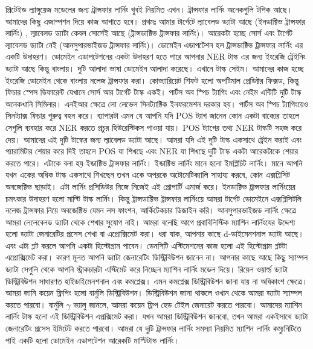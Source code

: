 \documentclass{article}[book]
\begin{document}
প্রিটেইন্ড ল্যাঙ্গুয়েজ মডেলের জন্য ট্রান্সফার লার্নিং খুবই নিয়মিত এখন। ট্রান্সফার লার্নিং অনেকগুলি টপিক আছে। আমাদের কিছু এজাম্পশন দিয়ে কাজ আগাতে হবে। প্রথমঃ আমার টার্গেটে ল্যাবেলড ড্যাটা আছে (ইনডাক্টিভ ট্রান্সফার লার্নিং) , ল্যাবেলড ড্যাটা কেবল সোর্সেই আছে (ট্রান্সডাক্টিভ ট্রান্সফার লার্নিং)। আরেকটা হচ্ছে সোর্স এবং টার্গেট ল্যাবেলড ড্যাটা নেই (আনসুপারভাইজড ট্রান্সফার লার্নিং)। ডোমেইন এডাপটেশন হল ট্রান্সডাক্টিভ ট্রান্সফার লার্নিং এর একটি উদাহরণ। ডোমেইন এডাপটেশনের একটা উদাহরণ হতে পারে আপনার NER টাস্ক এর জন্য ইংরেজি ট্রেইনিং ড্যাটা আছে কিন্তু বাংলায়। দুটি আলাদা ভাষা ডোমেইন আলাদা করেছে। এখানে টাস্ক সেইম। আমাদের কাজ হচ্ছে ইংরেজি ডোমেইন থেকে বাংলায় নলেজ ট্রান্সফার করা।  কোভ্যারিয়েট শিফট হলো অপটিমাল প্রেডিক্টর ফিক্সড, কিন্তু ফিচার স্পেস ডিফারেন্ট যেখানে সোর্স আর টার্গেট টাস্ক একই। পার্টস অব স্পিচ ট্যাগিং এবং নেইম এন্টিটি দুটি টাস্ক অনেকখানি সিমিলার। এনইআর ক্ষেত্রে লো লেভেল সিনট্যাক্টিক ইনফরমেশন দরকার হয়। পার্টস অব স্পিচ ট্যাগিংয়েও সিনট্যাক্স ফিচার গুরুত্ব বহন করে। ব্যাপারটা এমন যে আপনি যদি POS ট্যাগ জানেন কোন একটা বাক্যের তাহলে সেগুলি ব্যবহার করে NER করতে প্রচুর হিউরেস্টিকস পাওয়া যায়। POS ট্যাগের তথ্য NER টাস্কটি সহজ করে দেয়। আমাদের এই দুটি টাস্কের জন্য ল্যাবেলড ড্যাটা আছে। আমরা যদি এই দুটি টাস্ক একসাথে ট্রেইন করাই এবং প্যারামিটার শেয়ার করে দিই তাহলে POS যা শিখছে এবং NER যা শিখছে দুটি টাস্ক একটা আরেকটাকে শেয়ার করতে পারে। এটাকে বলা হয় ইন্ডাক্টিভ ট্রান্সফার লার্নিং। ইন্ডাক্টিভ লার্নিং মানে হলো ইমপ্লিচিট লার্নিং। মানে আপনি যখন একের অধিক টাস্ক একসাথে শিখছেন  তখন একে অপরকে অটোমেটিক্যালি সাহায্য করবে, কোন এক্সপ্লিসিট অবজেক্টিভ ছাড়াই। এটা লার্নিং প্রসিডিউর নিজে নিজেই এই প্রোপার্টি এমার্জ করে। ইনডাক্টিভ ট্রান্সফার লার্নিংয়ের চমৎকার উদাহরণ হলো মাল্টি টাস্ক লার্নিং। কিন্তু ট্রান্সডাক্টিভ ট্রান্সফার লার্নিংয়ে  আমরা টার্গেট ডোমেইনে এক্সপ্লিসিটলি নলেজ ট্রান্সফার নিয়ে অবজেক্টিভ যেমন লস ফাংশন, আর্কিটেকচার ডিজাইন করি। আনসুপারভাইজড লার্নিং ক্ষেত্রে আমরা লেলেবেলড ড্যাটা থেকে শেখার সুযোগ নাই। আমরা বলেছি আগে প্রবাবিলিস্টিক ম্যাশিন লার্নিংযের উদ্দেশ্য হলো ড্যাটা জেনারেটির প্রসেস শেখা বা এপ্রোক্সিমেট করা। ধরা যাক, আপনার কাছে d-ডাইমেনশনাল ড্যাটা আছে। এবং এটা  প্লট করলে আপনি একটা হিস্টোগ্রাম পাবেন। ডেনসিটি এস্টিমেশনের কাজ হলো এই হিস্টোগ্রাম প্লটটা এপ্রোক্সিমেট করা। কারণ মূলত আপনি ড্যাটা জেনারেটিং ডিস্ট্রিবিউশন জানেন না। আপনার কাছে আছে কিছু স্যাম্পল ড্যাটা সেগুলি থেকে আপনি স্ট্রাকচারটা এস্টিমেট করে নিচ্ছেন ম্যাশিন লার্নিং মডেল দিয়ে। রিয়েল ওয়ার্ল্ড ড্যাটা ডিস্ট্রিবিউশন সাধারণত হাইডাইমেনশনাল এবং কমপ্লেক্স। এমন কমপ্লেক্স ডিস্ট্রিবিউশন জানা যায় না অধিকাংশ ক্ষেত্রে। আমরা জানি কয়েন ফ্লিপিং হলো বার্নুলি ডিস্ট্রিবিউশন। ডিস্ট্রিবিউশন জানা থাকলে ওখান থেকে আমরা ড্যাটা স্যাম্পল করতে পারবো। বার্নুলি $\gamma$ ভ্যালু জানলে, আমরা কয়েন ফ্লিপ হেড টেইল জেনারেট করতে পারবো। আমাদের ম্যাশিন লার্নিং টাস্ক হলো এই ডিস্ট্রিবিউশন এপ্রক্সিমেট করা। যখন আমরা ডিস্ট্রিবিউশন জানবো, তখন আমরা একইসাথে ড্যাটা জেনারেটিং প্রসেস ইমিটেট করতে পারবো। আমরা যে দুটি ট্রান্সফার লার্নিং সমস্যা নিয়মিত ম্যাশিন লার্নিং কম্যুনিটিতে পাই একটি হলো ডোমেইন এডাপটেশন আরেকটি মাল্টিটাস্ক লার্নিং। 
\end{document}
